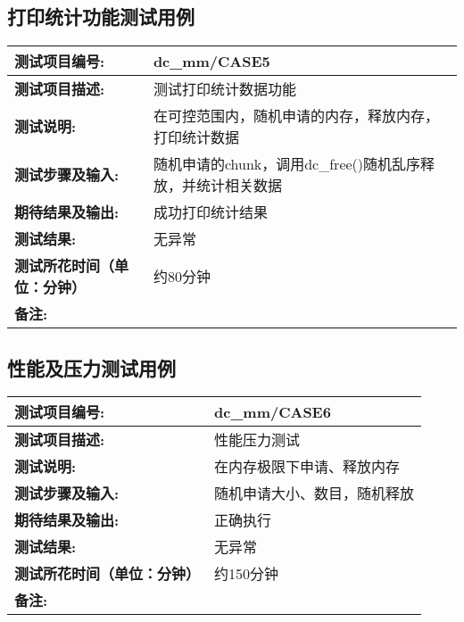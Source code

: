 \subsection {打印统计功能测试用例}
\begin{table}[H]
\centering
\begin{tabular}{|p{8em}|p{22em}|}
\hline
\textbf{测试项目编号:}&dc\_mm/CASE5\\
\hline
\textbf{测试项目描述:}&测试打印统计数据功能\\
\hline
\textbf{测试说明:}&在可控范围内，随机申请的内存，释放内存，打印统计数据\\
\hline
\textbf{测试步骤及输入:}&随机申请的chunk，调用dc\_free()随机乱序释放，并统计相关数据\\
\hline
\textbf{期待结果及输出:}&成功打印统计结果\\
\hline
\textbf{测试结果:}&无异常\\
\hline
\textbf{测试所花时间（单位：分钟）}& 约80分钟\\
\hline
\textbf{备注:}& \\
\hline
\end{tabular}
\end{table}


\subsection{性能及压力测试用例}
\begin{table}[H]
\centering
\begin{tabular}{|p{8em}|p{22em}|}
\hline
\textbf{测试项目编号:}&dc\_mm/CASE6\\
\hline
\textbf{测试项目描述:}&性能压力测试\\
\hline
\textbf{测试说明:}&在内存极限下申请、释放内存\\
\hline
\textbf{测试步骤及输入:}&随机申请大小、数目，随机释放\\
\hline
\textbf{期待结果及输出:}&正确执行\\
\hline
\textbf{测试结果:}& 无异常\\
\hline
\textbf{测试所花时间（单位：分钟）}& 约150分钟\\
\hline
\textbf{备注:}& \\
\hline
\end{tabular}
\end{table}



